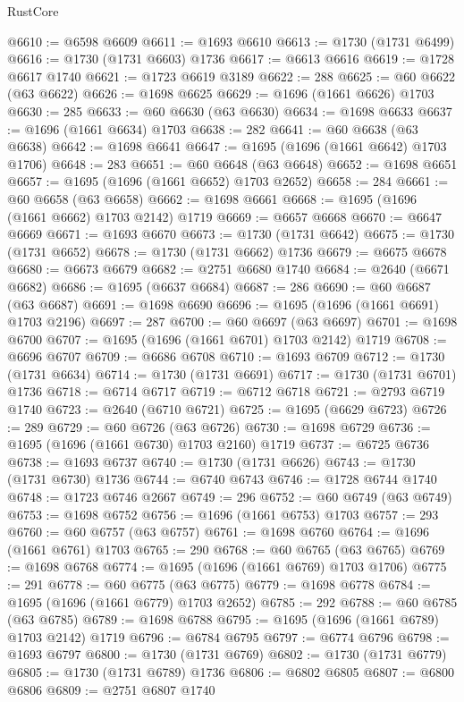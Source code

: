 \begin{lexlean}{RustCore}
\begin{coremodule}
@6610 := @6598 @6609
@6611 := @1693 @6610
@6613 := @1730 (@1731 @6499)
@6616 := @1730 (@1731 @6603) @1736
@6617 := @6613 @6616
@6619 := @1728 @6617 @1740
@6621 := @1723 @6619 @3189
@6622 := 288
@6625 := @60 @6622 (@63 @6622)
@6626 := @1698 @6625
@6629 := @1696 (@1661 @6626) @1703
@6630 := 285
@6633 := @60 @6630 (@63 @6630)
@6634 := @1698 @6633
@6637 := @1696 (@1661 @6634) @1703
@6638 := 282
@6641 := @60 @6638 (@63 @6638)
@6642 := @1698 @6641
@6647 := @1695 (@1696 (@1661 @6642) @1703 @1706)
@6648 := 283
@6651 := @60 @6648 (@63 @6648)
@6652 := @1698 @6651
@6657 := @1695 (@1696 (@1661 @6652) @1703 @2652)
@6658 := 284
@6661 := @60 @6658 (@63 @6658)
@6662 := @1698 @6661
@6668 := @1695 (@1696 (@1661 @6662) @1703 @2142) @1719
@6669 := @6657 @6668
@6670 := @6647 @6669
@6671 := @1693 @6670
@6673 := @1730 (@1731 @6642)
@6675 := @1730 (@1731 @6652)
@6678 := @1730 (@1731 @6662) @1736
@6679 := @6675 @6678
@6680 := @6673 @6679
@6682 := @2751 @6680 @1740
@6684 := @2640 (@6671 @6682)
@6686 := @1695 (@6637 @6684)
@6687 := 286
@6690 := @60 @6687 (@63 @6687)
@6691 := @1698 @6690
@6696 := @1695 (@1696 (@1661 @6691) @1703 @2196)
@6697 := 287
@6700 := @60 @6697 (@63 @6697)
@6701 := @1698 @6700
@6707 := @1695 (@1696 (@1661 @6701) @1703 @2142) @1719
@6708 := @6696 @6707
@6709 := @6686 @6708
@6710 := @1693 @6709
@6712 := @1730 (@1731 @6634)
@6714 := @1730 (@1731 @6691)
@6717 := @1730 (@1731 @6701) @1736
@6718 := @6714 @6717
@6719 := @6712 @6718
@6721 := @2793 @6719 @1740
@6723 := @2640 (@6710 @6721)
@6725 := @1695 (@6629 @6723)
@6726 := 289
@6729 := @60 @6726 (@63 @6726)
@6730 := @1698 @6729
@6736 := @1695 (@1696 (@1661 @6730) @1703 @2160) @1719
@6737 := @6725 @6736
@6738 := @1693 @6737
@6740 := @1730 (@1731 @6626)
@6743 := @1730 (@1731 @6730) @1736
@6744 := @6740 @6743
@6746 := @1728 @6744 @1740
@6748 := @1723 @6746 @2667
@6749 := 296
@6752 := @60 @6749 (@63 @6749)
@6753 := @1698 @6752
@6756 := @1696 (@1661 @6753) @1703
@6757 := 293
@6760 := @60 @6757 (@63 @6757)
@6761 := @1698 @6760
@6764 := @1696 (@1661 @6761) @1703
@6765 := 290
@6768 := @60 @6765 (@63 @6765)
@6769 := @1698 @6768
@6774 := @1695 (@1696 (@1661 @6769) @1703 @1706)
@6775 := 291
@6778 := @60 @6775 (@63 @6775)
@6779 := @1698 @6778
@6784 := @1695 (@1696 (@1661 @6779) @1703 @2652)
@6785 := 292
@6788 := @60 @6785 (@63 @6785)
@6789 := @1698 @6788
@6795 := @1695 (@1696 (@1661 @6789) @1703 @2142) @1719
@6796 := @6784 @6795
@6797 := @6774 @6796
@6798 := @1693 @6797
@6800 := @1730 (@1731 @6769)
@6802 := @1730 (@1731 @6779)
@6805 := @1730 (@1731 @6789) @1736
@6806 := @6802 @6805
@6807 := @6800 @6806
@6809 := @2751 @6807 @1740

\end{coremodule}
\end{lexlean}
